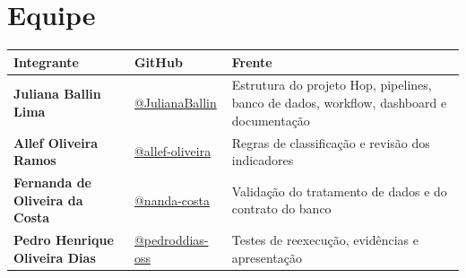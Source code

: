 \documentclass[12pt,a4paper,openany]{report}
\begin{document}
\chapter{Equipe}

\small
\begin{longtable}{>{\bfseries}p{} p{} p{}}
\toprule
Integrante & GitHub & Frente \\
\midrule
\endhead
Juliana Ballin Lima & \href{https://github.com/JulianaBallin}{@JulianaBallin} & Estrutura do projeto Hop, pipelines, banco de dados, workflow, dashboard e documentação \\
Allef Oliveira Ramos & \href{https://github.com/allef-oliveira}{@allef-oliveira} & Regras de classificação e revisão dos indicadores \\
Fernanda de Oliveira da Costa & \href{https://github.com/nanda-costa}{@nanda-costa} & Validação do tratamento de dados e do contrato do banco \\
Pedro Henrique Oliveira Dias & \href{https://github.com/pedroddias-oss}{@pedroddias-oss} & Testes de reexecução, evidências e apresentação \\
\bottomrule
\end{longtable}
\normalsize
\end{document}
